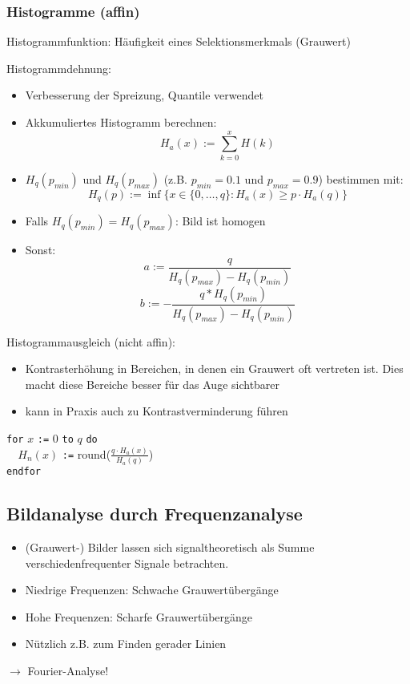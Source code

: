 \subsubsection{Histogramme (affin) }

Histogrammfunktion: Häufigkeit eines Selektionsmerkmals (Grauwert)

Histogrammdehnung:
\begin{itemize}
\item Verbesserung der Spreizung, Quantile verwendet
\item Akkumuliertes Histogramm berechnen: \[H_a(x):=\sum\limits_{k=0}^x H(k)\]
\item \(H_q(p_{min})\) und \(H_q(p_{max})\) (z.B. \(p_{min} = 0.1\) und \(p_{max} = 0.9\)) bestimmen mit: \[H_q(p) := \inf\{ x \in \{ 0, \dots ,q\}:H_a(x) \geq p \cdot H_a(q) \}\]
\item Falls \(H_q(p_{min}) = H_q(p_{max})\): Bild ist homogen
\item Sonst:
\[ a:=\frac{q}{H_q(p_{max}) - H_q(p_{min})} \]
\[ b:=-\frac{q*H_q(p_{min})}{H_q(p_{max}) - H_q(p_{min})} \]
\end{itemize}

Histogrammausgleich (nicht affin):
\begin{itemize}
	\item Kontrasterhöhung in Bereichen, in denen ein Grauwert oft vertreten ist. Dies macht diese Bereiche besser für das Auge sichtbarer
	\item kann in Praxis auch zu Kontrastverminderung führen
\end{itemize}
\verb|for| $x$ \verb|:=| $0$ \verb|to| $q$ \verb|do| \\
\verb|  |$H_n(x)$ \verb|:=| round($\frac{q \cdot H_a(x)}{H_a(q)}$) \\
\verb|endfor|

\subsection{Bildanalyse durch Frequenzanalyse}

\begin{itemize}
\item (Grauwert-) Bilder lassen sich signaltheoretisch als Summe verschiedenfrequenter Signale betrachten.
\item Niedrige Frequenzen: Schwache Grauwertübergänge
\item Hohe Frequenzen: Scharfe Grauwertübergänge
\item Nützlich z.B. zum Finden gerader Linien
\end{itemize}
$\to$ Fourier-Analyse!

